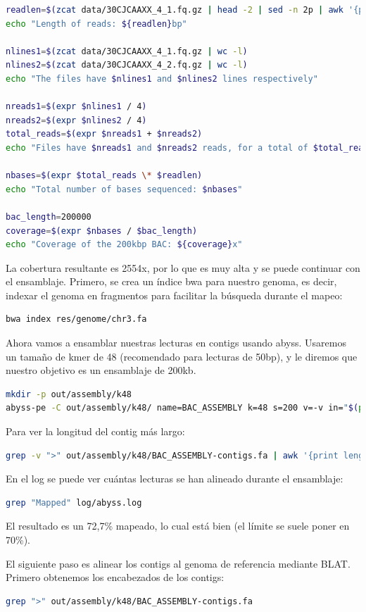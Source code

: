 \begin{itemize}
\begin{lstlisting}[language=bash]
readlen=$(zcat data/30CJCAAXX_4_1.fq.gz | head -2 | sed -n 2p | awk '{print length}')
echo "Length of reads: ${readlen}bp"

nlines1=$(zcat data/30CJCAAXX_4_1.fq.gz | wc -l)
nlines2=$(zcat data/30CJCAAXX_4_2.fq.gz | wc -l)
echo "The files have $nlines1 and $nlines2 lines respectively"

nreads1=$(expr $nlines1 / 4)
nreads2=$(expr $nlines2 / 4)
total_reads=$(expr $nreads1 + $nreads2)
echo "Files have $nreads1 and $nreads2 reads, for a total of $total_reads"

nbases=$(expr $total_reads \* $readlen)
echo "Total number of bases sequenced: $nbases"

bac_length=200000
coverage=$(expr $nbases / $bac_length)
echo "Coverage of the 200kbp BAC: ${coverage}x"
\end{lstlisting}

La cobertura resultante es 2554x, por lo que es muy alta y se puede continuar con el ensamblaje. Primero, se crea un índice bwa para nuestro genoma, es decir, indexar el genoma en fragmentos para facilitar la búsqueda durante el mapeo:
\begin{lstlisting}[language=bash]
bwa index res/genome/chr3.fa
\end{lstlisting}

Ahora vamos a ensamblar nuestras lecturas en contigs usando abyss.
Usaremos un tamaño de kmer de 48 (recomendado para lecturas de 50bp), y le diremos que nuestro objetivo es un ensamblaje de 200kb.
\begin{lstlisting}[language=bash]
mkdir -p out/assembly/k48
abyss-pe -C out/assembly/k48/ name=BAC_ASSEMBLY k=48 s=200 v=-v in="$(pwd)/data/30CJCAAXX_4_1.fq.gz $(pwd)/data/30CJCAAXX_4_2.fq.gz" contigs 2>&1 | tee log/abyss.log
\end{lstlisting}

Para ver la longitud del contig más largo:
\begin{lstlisting}[language=bash]
grep -v ">" out/assembly/k48/BAC_ASSEMBLY-contigs.fa | awk '{print length}' | sort -n | tail -1
\end{lstlisting}

En el log se puede ver cuántas lecturas se han alineado durante el ensamblaje:
\begin{lstlisting}[language=bash]
grep "Mapped" log/abyss.log
\end{lstlisting}
El resultado es un 72,7\% mapeado, lo cual está bien (el límite se suele poner en 70\%).

El siguiente paso es alinear los contigs al genoma de referencia mediante BLAT. Primero obtenemos los encabezados de los contigs:
\begin{lstlisting}[language=bash]
grep ">" out/assembly/k48/BAC_ASSEMBLY-contigs.fa
\end{lstlisting}


\end{itemize}
